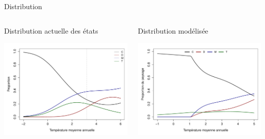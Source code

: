 \documentclass{eecslides}
\begin{document}

		\begin{frame}{Distribution}
		\begin{columns}
			\begin{column}{0.5\textwidth}
				Distribution actuelle des états
								\begin{center}
					\includegraphics[height=0.4\textheight]{SDM}
				\end{center}
			\end{column}
			\begin{column}{0.5\textwidth}
				Distribution modélisée
				\begin{center}
					\includegraphics[height=0.4\textheight]{SDMeq}
				\end{center}
			\end{column}
		\end{columns}	    	
	\end{frame}
\end{document}
